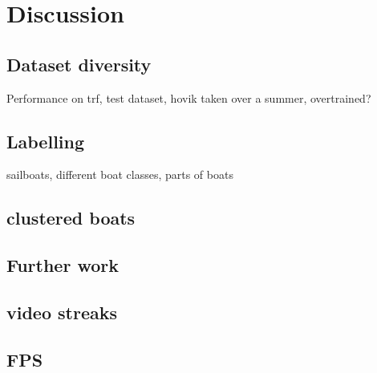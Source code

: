\chapter{Discussion}

\section{Dataset diversity}
\label{dataset_divers}
Performance on trf, test dataset, hovik taken over a summer, overtrained?

\section{Labelling}
sailboats, different boat classes, parts of boats

\section{clustered boats}

\section{Further work}

\section{video streaks}

\section{FPS}